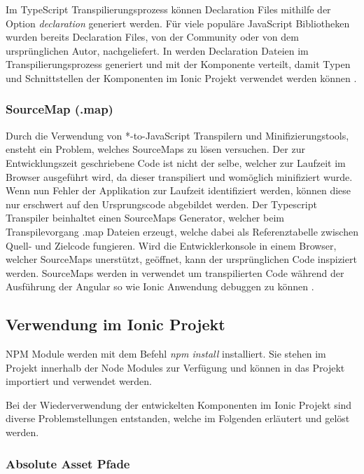 Im TypeScript Transpilierungsprozess können Declaration Files mithilfe der Option \emph{declaration} generiert werden.
Für viele populäre JavaScript Bibliotheken wurden bereits Declaration Files, von der Community oder von dem ursprünglichen Autor, nachgeliefert.
In \projectname{} werden Declaration Dateien im Transpilierungsprozess generiert und mit der Komponente verteilt,
damit Typen und Schnittstellen der Komponenten im Ionic Projekt verwendet werden können \cite[471]{EssentialTS}.


\subsubsection{SourceMap (.map)}
Durch die Verwendung von *-to-JavaScript Transpilern und Minifizierungstools, ensteht ein Problem, welches SourceMaps zu lösen versuchen.
Der zur Entwicklungszeit geschriebene Code ist nicht der selbe, welcher zur Laufzeit im Browser ausgeführt wird, da dieser transpiliert und womöglich minifiziert wurde.
Wenn nun Fehler der Applikation zur Laufzeit identifiziert werden, können diese nur erschwert auf den Ursprungscode abgebildet werden.
Der Typescript Transpiler beinhaltet einen SourceMaps Generator, welcher beim Transpilevorgang .map Dateien erzeugt,
welche dabei als Referenztabelle zwischen Quell- und Zielcode fungieren.
Wird die Entwicklerkonsole in einem Browser, welcher SourceMaps unerstützt, geöffnet, kann der ursprünglichen Code inspiziert werden.
SourceMaps werden in \projectname{} verwendet um transpilierten Code während der Ausführung der Angular so wie Ionic Anwendung debuggen zu können
 \cite{Using97:online}.



\subsection{Verwendung im Ionic Projekt}
\ac{NPM} Module werden mit dem Befehl \emph{npm install} installiert.
Sie stehen im Projekt innerhalb der Node Modules zur Verfügung und können in das Projekt importiert und verwendet werden.

Bei der Wiederverwendung der entwickelten Komponenten im Ionic Projekt sind diverse Problemstellungen entstanden,
welche im Folgenden erläutert und gelöst werden.

\subsubsection{Absolute Asset Pfade}
\label{Absolute-Asset-Pfade}

